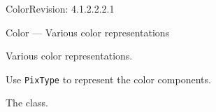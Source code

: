 %
%
% 
% 
% 
% 
%

\begin{manpage}{\libtitle}{Color}{$ $Revision: 4.1.2.2.2.1 $ $}

\subtitle{Name}
    Color --- Various color representations


\subtitle{Description}
    Various color representations.


\subtitle{Declaration}



\subtitle{Plans}
    Use \texttt{PixType} to represent the color components.


\subtitle{See Also}
    The  class.


\subtitle{Revision}

\end{manpage}
